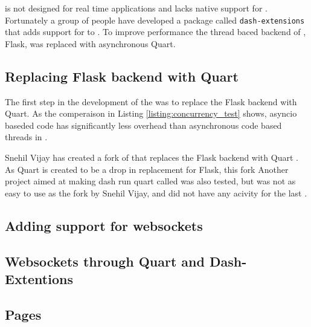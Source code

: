 \dash is not designed for real time applications and lacks native support for .
Fortunately a group of people have developed a package called \texttt{dash-extensions} that adds support for  to \dash \cite{eriksenDashExtensions}.
To improve performance the thread baced backend of \dash, Flask, was replaced with asynchronous Quart.

\subsection{Replacing Flask backend with Quart}
The first step in the development of the \guif was to replace the Flask backend with Quart.
As the comperaison in Listing \ref{listing:concurrency_test} shows, \gls{asyncio} baseded code has significantly less overhead than asynchronous code based threads in \py.


Snehil Vijay has created a fork of \dash that replaces the Flask backend with Quart \cite{vijaySnehilvjAsyncdash2023}.
As Quart is created to be a drop in replacement for Flask, this fork
Another project aimed at making \gls{dash} run \gls{quart} called  was also tested, but was not as easy to use as the fork by Snehil Vijay, and did not have any acivity for the last  \cite{legrandCodeFrequencyRichlegrand}.

\subsection{Adding support for websockets}
\subsection{Websockets through Quart and Dash-Extentions}
\cite{plotlyLiveUpdatesDash}








\subsection{Pages}
